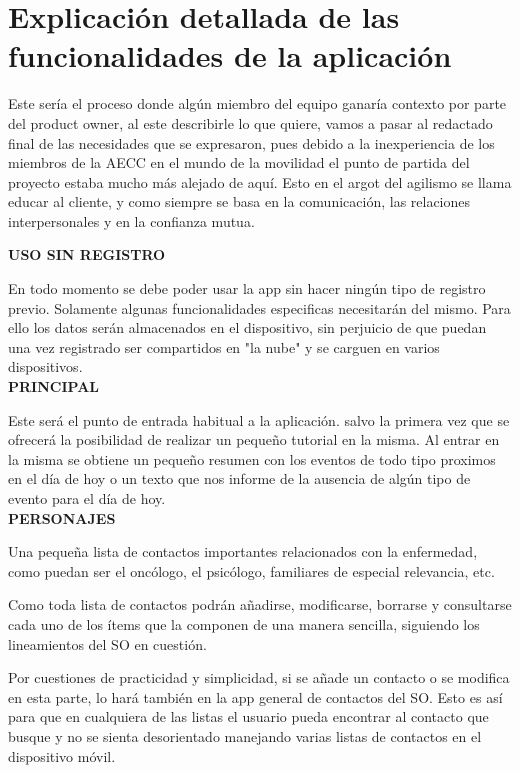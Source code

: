 \documentclass[../pfc.tex]{subfiles}
\begin{document}
	\section{Explicación detallada de las funcionalidades de la aplicación}

Este sería el proceso donde algún miembro del equipo ganaría contexto por parte del product owner, al este describirle lo que quiere, vamos a pasar al redactado final de las necesidades que se expresaron, pues debido a la inexperiencia de los miembros de la AECC en el mundo de la movilidad el punto de partida del proyecto estaba mucho más alejado de aquí. Esto en el argot del agilismo se llama educar al cliente, y como siempre se basa en la comunicación, las relaciones interpersonales y en la confianza mutua.

\textbf{USO SIN REGISTRO}

En todo momento se debe poder usar la app sin hacer ningún tipo de registro previo. Solamente algunas funcionalidades especificas necesitarán del mismo. Para ello los datos serán almacenados en el dispositivo, sin perjuicio de que puedan una vez registrado ser compartidos en "la nube" y se carguen en varios dispositivos.\\

	\textbf{PRINCIPAL}
	
	Este será el punto de entrada habitual a la aplicación. salvo la primera vez que se ofrecerá la posibilidad de realizar un pequeño tutorial en la misma. Al entrar en la misma se obtiene un pequeño resumen con los eventos de todo tipo proximos en el día de hoy o un texto que nos informe de la ausencia de algún tipo de evento para el día de hoy.\\
	
	\textbf{PERSONAJES}
	
	Una pequeña lista de contactos importantes relacionados con la enfermedad, como puedan ser el oncólogo, el psicólogo, familiares de especial relevancia, etc.
	
	Como toda lista de contactos podrán añadirse, modificarse, borrarse y consultarse cada uno de los ítems que la componen de una manera sencilla, siguiendo los lineamientos del SO en cuestión.
	
	Por cuestiones de practicidad y simplicidad, si se añade un contacto o se modifica en esta parte, lo hará también en la app general de contactos del SO. Esto es así para que en cualquiera de las listas el usuario pueda encontrar al contacto que busque y no se sienta desorientado manejando varias listas de contactos en el dispositivo móvil. \\
	
\end{document}
